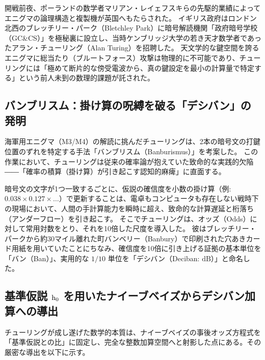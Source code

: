     開戦前夜、ポーランドの数学者マリアン・レイェフスキらの先駆的業績によってエニグマの論理構造と複製機が英国へもたらされた。
    イギリス政府はロンドン北西のブレッチリー・パーク（Bletchley Park）に暗号解読機関「政府暗号学校（GC\&CS）」を極秘裏に設立し、当時ケンブリッジ大学の若き天才数学者であったアラン・チューリング（Alan Turing）を招聘した。
    天文学的な鍵空間を誇るエニグマに総当たり（ブルートフォース）攻撃は物理的に不可能であり、チューリングには「極めて断片的な傍受電波から、真の鍵設定を最小の計算量で特定する」という前人未到の数理的課題が託された。

    \subsection{バンブリスム：掛け算の呪縛を破る「デシバン」の発明}
    海軍用エニグマ（M3/M4）の解読に挑んだチューリングは、2本の暗号文の打鍵位置のずれを特定する手法「バンブリスム（Banburismus）」を考案した。
    この作業において、チューリングは従来の確率論が抱えていた致命的な実践的欠陥――「確率の積算（掛け算）が引き起こす認知的麻痺」に直面する。

    暗号文の文字が1つ一致するごとに、仮説の確信度を小数の掛け算（例: $0.038 \times 0.127 \times \dots$）で更新することは、電卓もコンピュータも存在しない戦時下の現場において、人間の手計算能力を瞬時に超え、致命的な計算遅延と桁落ち（アンダーフロー）を引き起こす。
    そこでチューリングは、オッズ（Odds）に対して常用対数をとり、それを10倍した尺度を導入した。
    彼はブレッチリー・パークから約30マイル離れた町バンベリー（Banbury）で印刷された穴あきカード用紙を用いていたことにちなみ、確信度を10倍に引き上げる証拠の基本単位を「バン（Ban）」、実用的な $1/10$ 単位を「デシバン（Deciban: $\text{dB}$）」と命名した。

    \subsection{基準仮説 $\mathrm{h}_0$ を用いたナイーブベイズからデシバン加算への導出}
    チューリングが成し遂げた数学的本質は、ナイーブベイズの事後オッズ方程式を「基準仮説との比」に固定し、完全な整数加算空間へと射影した点にある。その厳密な導出を以下に示す。

